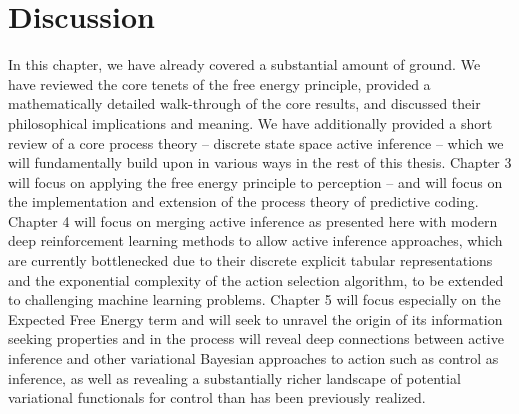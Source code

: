 \section{Discussion}

In this chapter, we have already covered a substantial amount of ground. We have reviewed the core tenets of the free energy principle, provided a mathematically detailed walk-through of the core results, and discussed their philosophical implications and meaning. We have additionally provided a short review of a core process theory -- discrete state space active inference -- which we will fundamentally build upon in various ways in the rest of this thesis. Chapter 3 will focus on applying the free energy principle to perception -- and will focus on the implementation and extension of the process theory of predictive coding. Chapter 4 will focus on merging active inference as presented here with modern deep reinforcement learning methods to allow active inference approaches, which are currently bottlenecked due to their discrete explicit tabular representations and the exponential complexity of the action selection algorithm, to be extended to challenging machine learning problems. Chapter 5 will focus especially on the Expected Free Energy term and will seek to unravel the origin of its information seeking properties and in the process will reveal deep connections between active inference and other variational Bayesian approaches to action such as control as inference, as well as revealing a substantially richer landscape of potential variational functionals for control than has been previously realized.